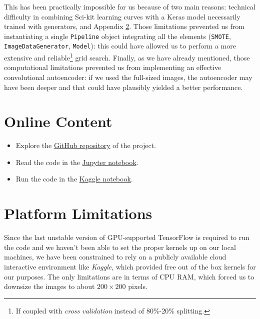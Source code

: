 \documentclass[aps,twocolumn,secnumarabic,nobalancelastpage,amsmath,amssymb,
nofootinbib]{revtex4}
\begin{document}
This has been practically impossible for us because of two main reasons: technical difficulty in combining Sci-kit learning curves with a Keras model necessarily trained with generators, and Appendix \ref{platform-limitations}. Those limitations prevented us from instantiating a single \texttt{Pipeline} object integrating all the elements (\texttt{SMOTE}, \texttt{ImageDataGenerator}, \texttt{Model}): this could have allowed us to perform a more extensive and reliable\footnote{If coupled with \emph{cross validation} instead of 80\%-20\% splitting.} grid search. Finally, as we have already mentioned, those computational limitations prevented us from implementing an effective convolutional autoencoder: if we used the full-sized images, the autoencoder may have been deeper and that could have plausibly yielded a better performance.


\appendix


\section{Online Content}\label{additional-material}

\begin{itemize}

\item
Explore the
\href{https://github.com/InPhyT/NeuralNetworksProject}{GitHub
	repository} of the project.
\vspace{-0.2cm}\item
Read the code in the
\href{https://nbviewer.jupyter.org/github/InPhyT/NeuralNetworksProject/blob/master/Notebooks/notebook.ipynb}{Jupyter
	notebook}.
\vspace{-0.2cm}\item
Run the code in the
\href{https://www.kaggle.com/inphyt2020/neuralnetworksproject}{Kaggle
	notebook}.
\end{itemize}

\section{Platform Limitations}\label{platform-limitations}

Since the last unstable version of GPU-supported TensorFlow is required
to run the code and we haven't been able to set the proper kernels up on
our local machines, we have been constrained to rely on a publicly
available cloud interactive environment like \emph{Kaggle}, which
provided free out of the box kernels for our purposes. The only
limitations are in terms of CPU RAM, which forced us to downsize the
images to about $200 \times 200$ pixels.
\end{document}
